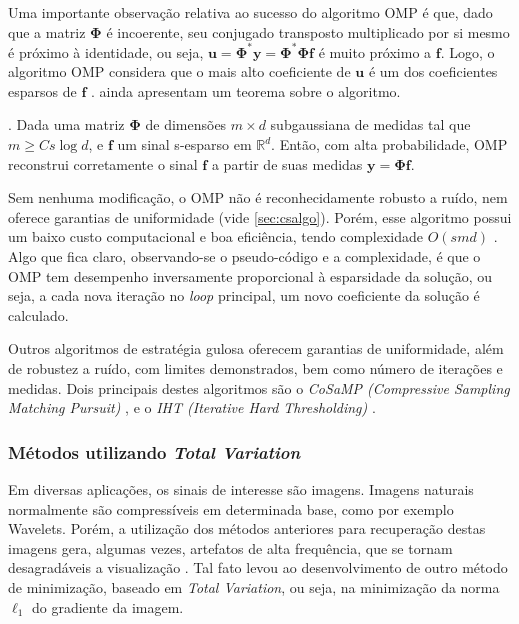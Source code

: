 \documentclass[cic,tc]{iiufrgs}
\renewcommand{\vec}[1]{\bm{#1}}
\begin{document}
Uma importante observação relativa ao sucesso do algoritmo OMP é que, dado que a matriz $\mathbf{\Phi}$ é incoerente,
seu conjugado transposto multiplicado por si mesmo é próximo à identidade, ou seja, 
$\vec{u} = \mathbf{\Phi}^* \vec{y} = \mathbf{\Phi}^* \mathbf{\Phi} \vec{f}$ 
é muito próximo a $\vec{f}$. 
Logo, o algoritmo OMP considera que o mais alto coeficiente de 
$\vec{u}$ é um dos coeficientes esparsos de $\vec{f}$ \cite{chen2015compressed}.
\citet{GilbertOMP} ainda apresentam um teorema sobre o algoritmo.
\begin{teorema}
    \cite{GilbertOMP}.
    Dada uma matriz $\mathbf{\Phi}$ de dimensões $m \times d$ subgaussiana de medidas tal que $m \ge C s \log{d}$, e
    $\vec{f}$ um sinal s-esparso em $\mathbb{R}^d$.
    Então, com alta probabilidade, OMP reconstrui corretamente o sinal $\vec{f}$ a partir de suas
    medidas $\vec{y} = \mathbf{\Phi}\vec{f}$.
\end{teorema}
Sem nenhuma modificação, o OMP não é reconhecidamente robusto a ruído, nem oferece garantias de uniformidade (vide \autoref{sec:csalgo}).
Porém, esse algoritmo possui um baixo custo computacional e boa eficiência, tendo complexidade 
$O(s m d)$ \cite{chen2015compressed}. 
Algo que fica claro, observando-se o pseudo-código e a complexidade, é que o OMP tem desempenho inversamente
proporcional à esparsidade da solução, ou seja, a cada nova iteração no \textit{loop} principal, um 
novo coeficiente da solução é calculado.

Outros algoritmos de estratégia gulosa oferecem garantias de uniformidade, além de robustez a ruído, com 
limites demonstrados, bem como número de iterações e medidas. Dois principais destes algoritmos são o 
\textit{CoSaMP (Compressive Sampling Matching Pursuit)} \cite{NeedellCoSaMP}, e o 
\textit{IHT (Iterative Hard Thresholding)} \cite{BLUMENSATHIHT}.

\subsubsection{Métodos utilizando \textit{Total Variation}}
Em diversas aplicações, os sinais de interesse são imagens. Imagens naturais normalmente são compressíveis
em determinada base, como por exemplo Wavelets. 
Porém, a utilização dos métodos anteriores para recuperação 
destas imagens gera, algumas vezes, artefatos de alta frequência, que se tornam desagradáveis a
visualização \cite{chen2015compressed}.
Tal fato levou ao desenvolvimento de outro método de minimização, baseado em \textit{Total Variation},
ou seja, na minimização da norma $\ell_1$ do gradiente da imagem.
\end{document}
